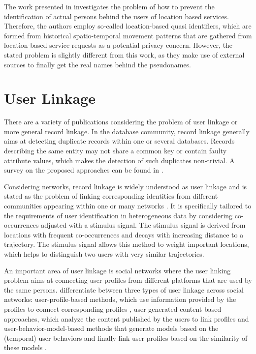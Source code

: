 The work presented in \citeauthor{Bettini2005} \cite{Bettini2005} investigates the problem of how to prevent the identification of actual persons behind the users of location based services. Therefore, the authors employ so-called location-based quasi identifiers, which are formed from historical spatio-temporal movement patterns that are gathered from location-based service requests as a potential privacy concern. However, the stated problem is slightly different from this work, as they make use of external sources to finally get the real names behind the pseudonames.

\section{User Linkage}
There are a variety of publications considering the problem of user linkage or more general record linkage. In the database community, record linkage generally aims at detecting duplicate records within one or several databases. Records describing the same entity may not share a common key or contain faulty attribute values, which makes the detection of such duplicates non-trivial. A survey on the proposed approaches can be found in \citeauthor{Elmagarmid2007} \cite{Elmagarmid2007}.

Considering networks, record linkage is widely understood as user linkage and is stated as the problem of linking corresponding identities from different communities appearing within one or many networks \citeauthor{Zafarani2009} \cite{Zafarani2009}. It is specifically tailored to the requirements of user identification in heterogeneous data by considering co-occurrences adjusted with a stimulus signal. The stimulus signal is derived from locations with frequent co-occurrences and decays with increasing distance to a trajectory. The stimulus signal allows this method to weight important locations, which helps to distinguish two users with very similar trajectories.

An important area of user linkage is social networks where the user linking problem aims at connecting user profiles from different platforms that are used by the same persons. \citeauthor{Liu2013} \cite{Liu2013} differentiate between three types of user linkage across social networks: user-profile-based methods, which use information provided by the profiles to connect corresponding profiles \cite{Malhotra2012}, user-generated-content-based approaches, which analyze the content published by the users to link profiles \cite{Liu2013} and user-behavior-model-based methods that generate models based on the (temporal) user behaviors and finally link user profiles based on the similarity of these models \cite{Liu2014}.

